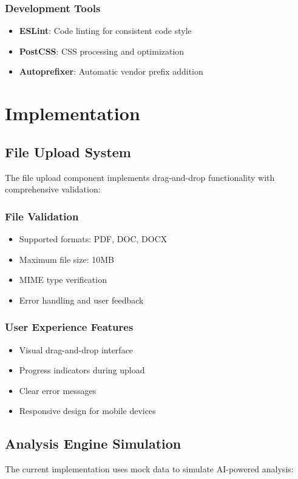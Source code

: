 \documentclass[12pt,a4paper]{article}
\begin{document}
\subsubsection{Development Tools}
\begin{itemize}
    \item \textbf{ESLint}: Code linting for consistent code style
    \item \textbf{PostCSS}: CSS processing and optimization
    \item \textbf{Autoprefixer}: Automatic vendor prefix addition
\end{itemize}

\section{Implementation}

\subsection{File Upload System}
The file upload component implements drag-and-drop functionality with comprehensive validation:

\subsubsection{File Validation}
\begin{itemize}
    \item Supported formats: PDF, DOC, DOCX
    \item Maximum file size: 10MB
    \item MIME type verification
    \item Error handling and user feedback
\end{itemize}

\subsubsection{User Experience Features}
\begin{itemize}
    \item Visual drag-and-drop interface
    \item Progress indicators during upload
    \item Clear error messages
    \item Responsive design for mobile devices
\end{itemize}

\subsection{Analysis Engine Simulation}
The current implementation uses mock data to simulate AI-powered analysis:
\end{document}
